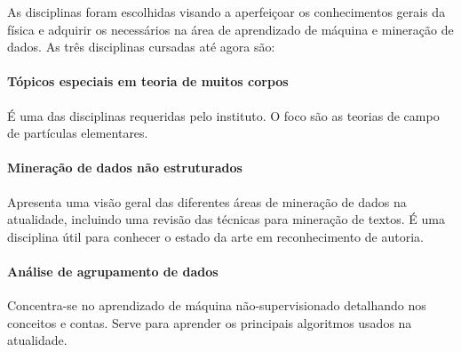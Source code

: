 \documentclass[a4paper,openright,12pt]{report} %
\begin{document}
As disciplinas foram escolhidas visando a aperfei\c coar os conhecimentos gerais da f\'isica e adquirir os necess\'arios na \'area de aprendizado de m\'aquina e minera\c c\~ao de dados. As tr\^es disciplinas cursadas at\'e agora s\~ao:

\paragraph{T\'opicos especiais em teoria de muitos corpos}{\'E uma das disciplinas requeridas pelo instituto. O foco s\~ao as teorias de campo de part\'iculas elementares.}

\paragraph{Minera\c c\~ao de dados n\~ao estruturados}{Apresenta uma vis\~ao geral das diferentes \'areas de minera\c c\~ao de dados na atualidade, incluindo uma revis\~ao das t\'ecnicas para minera\c c\~ao de textos. \'E uma disciplina \'util para conhecer o estado da arte em reconhecimento de autoria.}

\paragraph{An\'alise de agrupamento de dados}{Concentra-se no aprendizado de m\'aquina n\~ao-supervisionado detalhando nos conceitos e contas. Serve para aprender os principais algoritmos usados na atualidade.}



\end{document}
